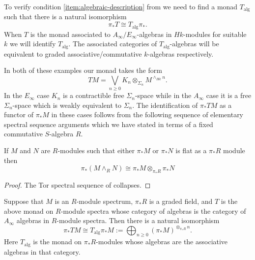 \documentclass[leqno,oneside,english]{elsarticle}
\begin{document}
To verify condition \eqref{item:algebraic-description} from  we need to find a monad $T_{\mathrm{alg}}$ such that there is a natural isomorphism \[\pi_* T \cong T_{\mathrm{alg}}\pi_*. \] When $T$ is the monad associated to $A_{\infty}/E_{\infty}$-algebras in $Hk$-modules for suitable $k$ we will identify $T_{\mathrm{alg}}$. The associated categories of $T_{\mathrm{alg}}$-algebras will be equivalent to graded associative/commutative $k$-algebras respectively.

In both of these examples our monad takes the form
\[TM=\bigvee_{n\geq 0} K_{n}\otimes_{\Sigma_n} M^{\wedge_{Hk}n}.\] In the
$E_\infty$ case $K_n$ is a contractible free $\Sigma_n$-space while in the
$A_{\infty}$ case it is a free $\Sigma_n$-space which is weakly equivalent to $\Sigma_n$. The identification of
$\pi_* TM$ as a functor of $\pi_* M$ in these cases follows from the following sequence of elementary spectral sequence arguments which we have stated in terms of a fixed commutative $S$-algebra $R$. 

{{\ifshowsaveblocks
{}
\fi}}{}

\begin{lemma}\label{lem:HR-mod-vs-R-mod-pi-monoidal}
  If $M$ and $N$ are $R$-modules such
  that either $\pi_*M$ or $\pi_* N$ is flat as a $\pi_* R$ module then 
  \[
  \pi_* (M\wedge_{R}N)\cong \pi_*M \otimes_{\pi_* R} \pi_*N
  \]
\end{lemma}
\begin{proof}
  The Tor spectral sequence of \cite[Thm.~IV.4.1]{EKMM97} collapses.
\end{proof} 

\begin{prop}\label{prop:a-infty-identification}
  Suppose that $M$ is an $R$-module spectrum, $\pi_*R$ is a graded
  field, and $T$ is the above monad on $R$-module spectra whose category of
  algebras is the category of $A_{\infty}$ algebras in $R$-module
  spectra. Then there is a natural isomorphism 
  \[ \pi_* TM \cong T_{\mathrm{alg}}\pi_* M :=
  \bigoplus_{n\geq 0} (\pi_*M)^{\otimes_{\pi_*R}  n}.\] 
  Here $T_{\mathrm{alg}}$ is the monad on $\pi_*R$-modules whose algebras are the
  associative algebras in that category.
\end{prop}
\end{document}
